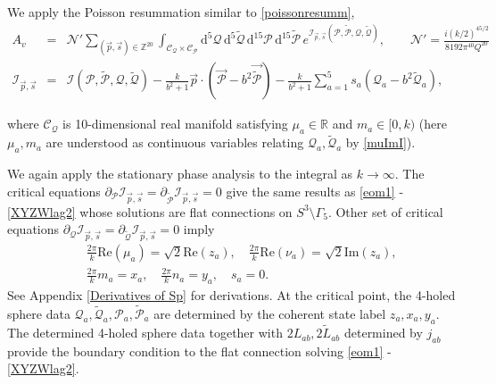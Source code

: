\documentclass[aps,prd,notitlepage,nofootinbib,superscriptaddress,groupedaddress,twocolumn]{revtex4-1}
\def\R{\mathbb{R}}
\def\be{\begin{eqnarray}}
\def\ee{\end{eqnarray}}
\newcommand{\cc}{\mathcal C}
\newcommand{\ci}{\mathcal I}
\newcommand{\cn}{\mathcal N}
\newcommand{\cx}{\mathcal X}
\newcommand{\cy}{\mathcal Y}
\newcommand{\scrp}{\mathscr{P}}
\newcommand{\scrq}{\mathscr{Q}}
\newcommand{\G}{\Gamma}
\begin{document}
\begin{widetext}
We apply the Poisson resummation similar to \eqref{poissonresumm},
\be
A_v&=&\cn'\sum_{(\vec{p},\vec{s}) \in\mathbb{Z}^{20} } \int_{\cc_\scrq\times\cc_\scrp}\mathrm{d}^{5} \scrq\, \mathrm{d}^{5} \widetilde{\scrq}\, \mathrm{d}^{15} \scrp\, \mathrm{d}^{15} \widetilde{\scrp}\, e^{\ci_{\vec{p},\vec{s}}(\scrp, \widetilde{\scrp}, \mathscr{Q}, \widetilde{\mathscr{Q}})},\qquad \cn'=\frac{i\left({k}/{2}\right)^{45/2}}{8192 \pi ^{40}  Q^{20}}\\
\ci_{\vec{p},\vec{s}}&=&\ci(\scrp, \widetilde{\scrp}, \mathscr{Q}, \widetilde{\mathscr{Q}})-\frac{k}{b^{2}+1} \vec{p} \cdot\left(\vec{\scrp}-b^{2} \vec{\widetilde{\scrp}}\right)-\frac{k}{b^{2}+1}\sum_{a=1}^5 {s}_a\left({\scrq}_a-b^{2} \widetilde{\scrq}_a\right),
\ee
\end{widetext}
where $\cc_{\scrq}$ is 10-dimensional real manifold satisfying $\mu_a\in\R$ and $m_a\in [0,k)$ (here $\mu_a,m_a$ are understood as continuous variables relating $\scrq_a,\widetilde{\scrq}_a$ by \eqref{muImI}). 


We again apply the stationary phase analysis to the integral as $k\to\infty$. The critical equations $\partial_\scrp\ci_{\vec{p},\vec{s}}=\partial_{\widetilde{\scrp}}\ci_{\vec{p},\vec{s}}=0$ give the same results as \eqref{eom1} - \eqref{XYZWlag2} whose solutions are flat connections on $S^3\setminus\G_5$. Other set of critical equations $\partial_\scrq\ci_{\vec{p},\vec{s}}=\partial_{\widetilde{\scrq}}\ci_{\vec{p},\vec{s}}=0$ imply
\be
&&\frac{2\pi}{k}\mathrm{Re}(\mu_a)=\sqrt{2}\mathrm{Re}(z_a),\quad \frac{2\pi}{k}\mathrm{Re}(\nu_a)=\sqrt{2}\mathrm{Im}(z_a),\nonumber\\
&&\frac{2\pi}{k}m_a=x_a,\quad \frac{2\pi}{k}n_a=y_a,\quad s_a=0.\label{munumnzxy111}
\ee
See Appendix \ref{Derivatives of Sp} for derivations. At the critical point, the 4-holed sphere data $\scrq_a,\widetilde{\scrq}_a,\scrp_a,\widetilde{\scrp}_a%
$ are determined by the coherent state label $z_a,x_a,y_a$. The determined 4-holed sphere data together with $2L_{ab},2\widetilde{L}_{ab}$ determined by $j_{ab}$ provide the boundary condition to the flat connection solving \eqref{eom1} - \eqref{XYZWlag2}.
\end{document}
